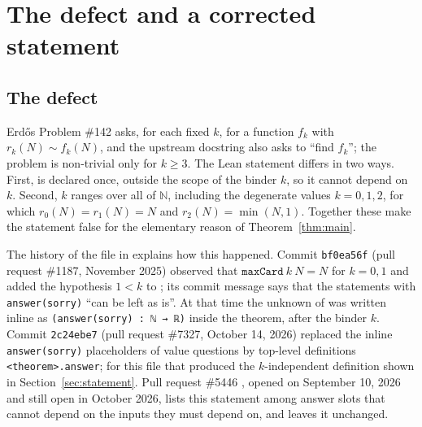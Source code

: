 \documentclass[11pt]{amsart}
\theoremstyle{plain}
\theoremstyle{definition}
\newcommand{\N}{\mathbb{N}}
\begin{document}
\section{The defect and a corrected statement}\label{sec:defect}

\subsection*{The defect}
Erd\H{o}s Problem \#142 asks, for each fixed $k$, for a function $f_k$ with $r_k(N)\sim f_k(N)$, and the upstream docstring also asks to ``find $f_k$''; the problem is non-trivial only for $k\ge 3$. The Lean statement differs in two ways. First,  is declared once, outside the scope of the binder $k$, so it cannot depend on $k$. Second, $k$ ranges over all of $\N$, including the degenerate values $k=0,1,2$, for which $r_0(N)=r_1(N)=N$ and $r_2(N)=\min(N,1)$. Together these make the statement false for the elementary reason of Theorem~\ref{thm:main}.

The history of the file in \cite{FC} explains how this happened. Commit \texttt{bf0ea56f} (pull request \#1187, November 2025) observed that $\texttt{maxCard}\ k\ N=N$ for $k=0,1$ and added the hypothesis $1<k$ to ; its commit message says that the statements with \texttt{answer(sorry)} ``can be left as is''. At that time the unknown of  was written inline as \texttt{(answer(sorry) : ℕ → ℝ)} inside the theorem, after the binder $k$. Commit \texttt{2c24ebe7} (pull request \#7327, October 14, 2026) replaced the inline \texttt{answer(sorry)} placeholders of value questions by top-level definitions \texttt{<theorem>.answer}; for this file that produced the $k$-independent definition shown in Section~\ref{sec:statement}. Pull request \#5446 \cite{PR5446}, opened on September 10, 2026 and still open in October 2026, lists this statement among answer slots that cannot depend on the inputs they must depend on, and leaves it unchanged.
\end{document}
